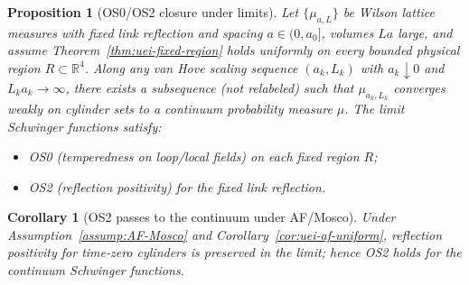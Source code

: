 \documentclass[11pt]{amsart}
\theoremstyle{plain}
\newtheorem{proposition}[theorem]{Proposition}
\newtheorem{corollary}[theorem]{Corollary}
\theoremstyle{definition}
\theoremstyle{remark}
\begin{document}
\begin{proposition}[OS0/OS2 closure under limits]\label{prop:os0os2-closure}
Let $\{\mu_{a,L}\}$ be Wilson lattice measures with fixed link reflection and spacing $a\in(0,a_0]$, volumes $L a$ large, and assume Theorem~\ref{thm:uei-fixed-region} holds uniformly on every bounded physical region $R\subset\mathbb R^4$. Along any van Hove scaling sequence $(a_k,L_k)$ with $a_k\downarrow 0$ and $L_k a_k\to\infty$, there exists a subsequence (not relabeled) such that $\mu_{a_k,L_k}$ converges weakly on cylinder sets to a continuum probability measure $\mu$. The limit Schwinger functions satisfy:
\begin{itemize}
  \item OS0 (temperedness on loop/local fields) on each fixed region $R$;
  \item OS2 (reflection positivity) for the fixed link reflection.
\end{itemize}
\end{proposition}

\begin{corollary}[OS2 passes to the continuum under AF/Mosco]\label{cor:os2-pass}
Under Assumption~\ref{assump:AF-Mosco} and Corollary~\ref{cor:uei-af-uniform}, reflection positivity for time-zero cylinders is preserved in the limit; hence OS2 holds for the continuum Schwinger functions.
\end{corollary}
\end{document}
